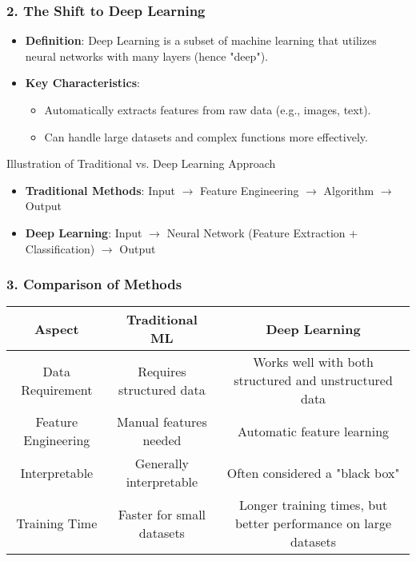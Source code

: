 \documentclass[aspectratio=169]{beamer}
\begin{document}
\begin{frame}
    \frametitle{2. The Shift to Deep Learning}
    \begin{itemize}
        \item \textbf{Definition}: Deep Learning is a subset of machine learning that utilizes neural networks with many layers (hence "deep").
        \item \textbf{Key Characteristics}:
        \begin{itemize}
            \item Automatically extracts features from raw data (e.g., images, text).
            \item Can handle large datasets and complex functions more effectively.
        \end{itemize}
    \end{itemize}
    \begin{block}{Illustration of Traditional vs. Deep Learning Approach}
        \begin{itemize}
            \item \textbf{Traditional Methods}: Input $\to$ Feature Engineering $\to$ Algorithm $\to$ Output
            \item \textbf{Deep Learning}: Input $\to$ Neural Network (Feature Extraction + Classification) $\to$ Output
        \end{itemize}
    \end{block}
\end{frame}

\begin{frame}
    \frametitle{3. Comparison of Methods}
    \begin{tabular}{|c|c|c|}
        \hline
        \textbf{Aspect} & \textbf{Traditional ML} & \textbf{Deep Learning} \\
        \hline
        Data Requirement & Requires structured data & Works well with both structured and unstructured data \\
        \hline
        Feature Engineering & Manual features needed & Automatic feature learning \\
        \hline
        Interpretable & Generally interpretable & Often considered a "black box" \\
        \hline
        Training Time & Faster for small datasets & Longer training times, but better performance on large datasets \\
        \hline
    \end{tabular}
\end{frame}
\end{document}
